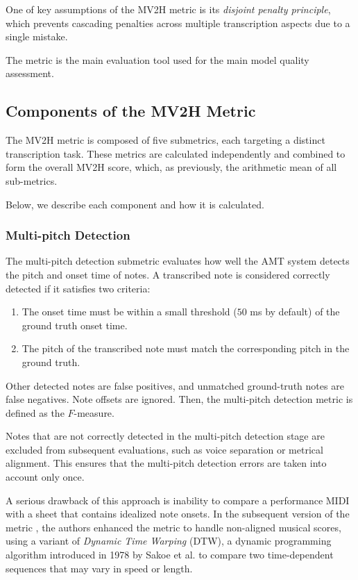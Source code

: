 One of key assumptions of the MV2H metric is its \emph{disjoint penalty principle}, which prevents cascading penalties across multiple transcription aspects due to a single mistake.

The metric is the main evaluation tool used for the main model quality assessment.

\subsection{Components of the MV2H Metric}

The MV2H metric is composed of five submetrics, each targeting a distinct transcription task. These metrics are calculated independently and combined to form the overall MV2H score, which, as previously, the arithmetic mean of all sub-metrics.

Below, we describe each component and how it is calculated.

\subsubsection{Multi-pitch Detection}

The multi-pitch detection submetric evaluates how well the AMT system detects the pitch and onset time of notes. A transcribed note is considered correctly detected if it satisfies two criteria: \begin{enumerate}
	\item The onset time must be within a small threshold ($50$ ms by default) of the ground truth onset time.
	\item The pitch of the transcribed note must match the corresponding pitch in the ground truth.\end{enumerate} Other detected notes are false positives, and unmatched ground-truth notes are false negatives. Note offsets are ignored. Then, the multi-pitch detection metric is defined as the $F$-measure.

Notes that are not correctly detected in the multi-pitch detection stage are excluded from subsequent evaluations, such as voice separation or metrical alignment. This ensures that the multi-pitch detection errors are taken into account only once.

A serious drawback of this approach is inability to compare a performance MIDI with a sheet that contains idealized note onsets. In the subsequent version of the metric \cite{McLeod2019}, the authors enhanced the metric to handle non-aligned musical scores, using a variant of \emph{Dynamic Time Warping} (DTW), a dynamic programming algorithm introduced in 1978 by Sakoe et al. \cite{Sakoe1978} to compare two time-dependent sequences that may vary in speed or length. 

